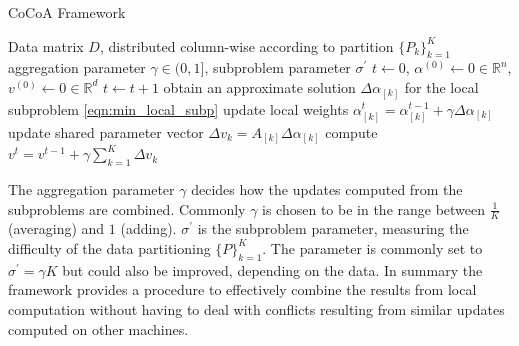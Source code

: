 \begin{algorithm}
\caption{CoCoA Framework}\label{alg:cocoa}
\begin{algorithmic}[1]{}
\DATA Data matrix $D$, distributed column-wise according to partition $\{P_k\}_{k=1}^K$
\INPUT aggregation parameter $\gamma \in (0,1]$, subproblem parameter $\sigma^\prime$
\INIT $t \gets 0$, $\alpha^{(0)} \gets 0 \in \mathbb{R}^n$, $v^{(0)} \gets 0 \in \mathbb{R}^d$ 
\Repeat
\State $t \gets t + 1$
\State obtain an approximate solution $\Delta\alpha_{[k]}$ for the local subproblem \ref{eqn:min_local_subp}
\State update local weights $\alpha_{[k]}^{t} = \alpha_{[k]}^{t-1} + \gamma\Delta\alpha_{[k]}$
\State update shared parameter vector $\Delta v_k = A_{[k]}\Delta\alpha_{[k]}$
\EndFor
\State compute $v^{t} = v^{t-1} + \gamma\sum_{k=1}^K\Delta v_k$
\end{algorithmic}
\end{algorithm}
The aggregation parameter $\gamma$ decides how the updates computed from the subproblems are combined.
Commonly $\gamma$ is chosen to be in the range between $\frac{1}{K}$ (averaging) and $1$ (adding).
$\sigma^\prime$ is the subproblem parameter, measuring the difficulty of the data partitioning $\{P\}_{k=1}^K$.
The parameter is commonly set to $\sigma^\prime = \gamma K$ but could also be improved, depending on the data.
In summary the framework provides a procedure to effectively combine the results from local computation without having to deal with conflicts resulting from similar updates computed on other machines.

